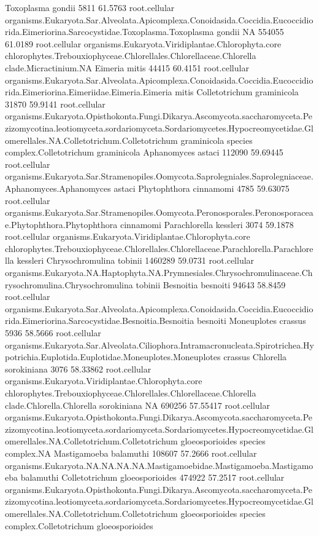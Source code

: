 \documentclass{article}
\begin{document}
\begin{Schunk}
\begin{Soutput}
 Toxoplasma gondii 		 5811 61.5763 	 root.cellular organisms.Eukaryota.Sar.Alveolata.Apicomplexa.Conoidasida.Coccidia.Eucoccidiorida.Eimeriorina.Sarcocystidae.Toxoplasma.Toxoplasma gondii
 NA 		 554055 61.0189 	 root.cellular organisms.Eukaryota.Viridiplantae.Chlorophyta.core chlorophytes.Trebouxiophyceae.Chlorellales.Chlorellaceae.Chlorella clade.Micractinium.NA
 Eimeria mitis 		 44415 60.4151 	 root.cellular organisms.Eukaryota.Sar.Alveolata.Apicomplexa.Conoidasida.Coccidia.Eucoccidiorida.Eimeriorina.Eimeriidae.Eimeria.Eimeria mitis
 Colletotrichum graminicola 		 31870 59.9141 	 root.cellular organisms.Eukaryota.Opisthokonta.Fungi.Dikarya.Ascomycota.saccharomyceta.Pezizomycotina.leotiomyceta.sordariomyceta.Sordariomycetes.Hypocreomycetidae.Glomerellales.NA.Colletotrichum.Colletotrichum graminicola species complex.Colletotrichum graminicola
 Aphanomyces astaci 		 112090 59.69445 	 root.cellular organisms.Eukaryota.Sar.Stramenopiles.Oomycota.Saprolegniales.Saprolegniaceae.Aphanomyces.Aphanomyces astaci
 Phytophthora cinnamomi 		 4785 59.63075 	 root.cellular organisms.Eukaryota.Sar.Stramenopiles.Oomycota.Peronosporales.Peronosporaceae.Phytophthora.Phytophthora cinnamomi
 Parachlorella kessleri 		 3074 59.1878 	 root.cellular organisms.Eukaryota.Viridiplantae.Chlorophyta.core chlorophytes.Trebouxiophyceae.Chlorellales.Chlorellaceae.Parachlorella.Parachlorella kessleri
 Chrysochromulina tobinii 		 1460289 59.0731 	 root.cellular organisms.Eukaryota.NA.Haptophyta.NA.Prymnesiales.Chrysochromulinaceae.Chrysochromulina.Chrysochromulina tobinii
 Besnoitia besnoiti 		 94643 58.8459 	 root.cellular organisms.Eukaryota.Sar.Alveolata.Apicomplexa.Conoidasida.Coccidia.Eucoccidiorida.Eimeriorina.Sarcocystidae.Besnoitia.Besnoitia besnoiti
 Moneuplotes crassus 		 5936 58.5666 	 root.cellular organisms.Eukaryota.Sar.Alveolata.Ciliophora.Intramacronucleata.Spirotrichea.Hypotrichia.Euplotida.Euplotidae.Moneuplotes.Moneuplotes crassus
 Chlorella sorokiniana 		 3076 58.33862 	 root.cellular organisms.Eukaryota.Viridiplantae.Chlorophyta.core chlorophytes.Trebouxiophyceae.Chlorellales.Chlorellaceae.Chlorella clade.Chlorella.Chlorella sorokiniana
 NA 		 690256 57.55417 	 root.cellular organisms.Eukaryota.Opisthokonta.Fungi.Dikarya.Ascomycota.saccharomyceta.Pezizomycotina.leotiomyceta.sordariomyceta.Sordariomycetes.Hypocreomycetidae.Glomerellales.NA.Colletotrichum.Colletotrichum gloeosporioides species complex.NA
 Mastigamoeba balamuthi 		 108607 57.2666 	 root.cellular organisms.Eukaryota.NA.NA.NA.NA.Mastigamoebidae.Mastigamoeba.Mastigamoeba balamuthi
 Colletotrichum gloeosporioides 		 474922 57.2517 	 root.cellular organisms.Eukaryota.Opisthokonta.Fungi.Dikarya.Ascomycota.saccharomyceta.Pezizomycotina.leotiomyceta.sordariomyceta.Sordariomycetes.Hypocreomycetidae.Glomerellales.NA.Colletotrichum.Colletotrichum gloeosporioides species complex.Colletotrichum gloeosporioides

\end{Soutput}
\end{Schunk}
\end{document}
